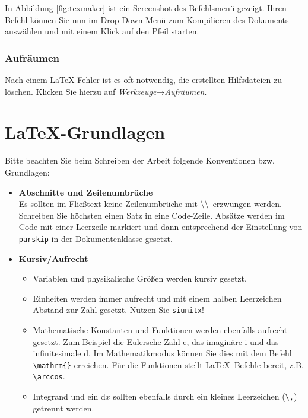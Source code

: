 In Abbildung \ref{fig:texmaker} ist ein Screenshot des Befehlsmenü gezeigt. Ihren Befehl können Sie nun im Drop-Down-Menü zum 
Kompilieren des Dokuments auswählen und mit einem Klick auf den Pfeil starten.

\subsection{Aufräumen}

Nach einem \LaTeX-Fehler ist es oft notwendig, die erstellten Hilfsdateien zu löschen.
Klicken Sie hierzu auf \emph{Werkzeuge}→\emph{Aufräumen}.


\chapter{\LaTeX-Grundlagen}

Bitte beachten Sie beim Schreiben der Arbeit folgende Konventionen bzw. Grundlagen:

\begin{itemize}
    \item \textbf{Abschnitte und Zeilenumbrüche} \\
        Es sollten im Fließtext keine Zeilenumbrüche mit \textbackslash\textbackslash \ erzwungen werden.
        Schreiben Sie höchsten einen Satz in eine Code-Zeile.
        Absätze werden im Code mit einer Leerzeile markiert und dann entsprechend der Einstellung von \texttt{parskip} in der Dokumentenklasse gesetzt.
    \item \textbf{Kursiv/Aufrecht} \\
        \begin{itemize}
            \item Variablen und physikalische Größen werden kursiv gesetzt. 
            \item Einheiten werden immer aufrecht und mit einem halben Leerzeichen Abstand zur Zahl gesetzt. Nutzen Sie \texttt{siunitx}!
            \item Mathematische Konstanten und Funktionen werden ebenfalls aufrecht gesetzt. Zum Beispiel die Eulersche Zahl e, das imaginäre i und das infinitesimale d.
                Im Mathematikmodus können Sie dies mit dem Befehl \verb_\mathrm{}_ erreichen. Für die Funktionen stellt \LaTeX \ Befehle bereit, z.B. \verb+\arccos+.
            \item Integrand und ein $\mathrm{d}x$ sollten ebenfalls durch ein kleines Leerzeichen (\verb+\,+) getrennt werden.
        \end{itemize}
        


\end{itemize}

